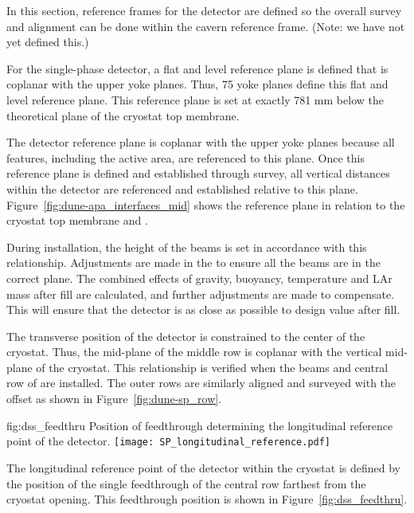 In this section, reference frames for the detector are defined so the
overall survey and alignment can be done within the cavern reference
frame. (Note: we have not yet defined this.)


For the single-phase detector, a flat and level reference plane is
defined that is coplanar with the upper  yoke planes. Thus,
75 yoke planes define this flat and level reference plane. This
reference plane is set at exactly 781 mm below the theoretical plane
of the cryostat top membrane.


The detector reference plane is coplanar with the upper 
yoke planes because all features, including the active area, are
referenced to this plane.  Once this reference plane is defined and
established through survey, all vertical distances within the detector
are referenced and established relative to this plane.
Figure~\ref{fig:dune-apa_interfaces_mid} shows the reference plane in
relation to the cryostat top membrane and .


During installation, the height of the  beams is set in
accordance with this relationship. Adjustments are made in the
 to ensure all the beams are in the correct plane. The
combined effects of gravity, buoyancy, temperature and LAr mass after
fill are calculated, and further adjustments are made to
compensate. This will ensure that the detector is as close as possible
to design value after fill.


The transverse position of the detector is constrained to the center
of the cryostat. Thus, the mid-plane of the middle row  is
coplanar with the vertical mid-plane of the cryostat. This
relationship is verified when the  beams and central row of
 are installed. The outer rows are similarly aligned and
surveyed with the offset as shown in Figure~\ref{fig:dune-sp_row}.
\begin{dunefigure}{fig:dss_feedthru}
  {Position of feedthrough determining the longitudinal reference point of the detector.}
  \texttt{[image: SP\_longitudinal\_reference.pdf]}
\end{dunefigure}


The longitudinal reference point of the detector within the cryostat
is defined by the position of the single feedthrough of the central row
farthest from the cryostat opening. This feedthrough position
is shown in Figure~\ref{fig:dss_feedthru}.



